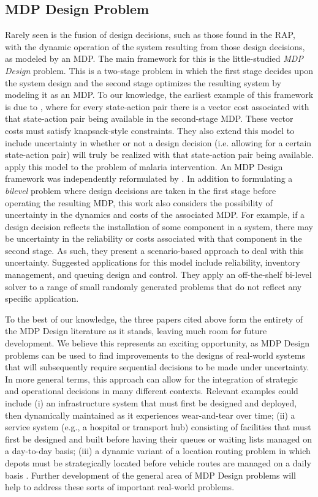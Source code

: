 \documentclass[11pt,authoryear,a4paper]{article}
\theoremstyle{definition}
\begin{document}
\subsection{MDP Design Problem}
Rarely seen is the fusion of design decisions, such as those found in the RAP, with the dynamic operation of the system resulting from those design decisions, as modeled by an MDP. The main framework for this is the little-studied \emph{MDP Design} problem. This is a two-stage problem in which the first stage decides upon the system design and the second stage optimizes the resulting system by modeling it as an MDP. To our knowledge, the earliest example of this framework is due to \cite{dimitrov2009mdpDesign}, where for every state-action pair there is a vector cost associated with that state-action pair being available in the second-stage MDP. These vector costs must satisfy knapsack-style constraints. They also extend this model to include uncertainty in whether or not a design decision (i.e. allowing for a certain state-action pair) will truly be realized with that state-action pair being available. \cite{DIMITROV2013mdpDesignMalaria} apply this model to the problem of malaria intervention. An MDP Design framework was independently reformulated by \cite{BROWN2024mdpDesignLetters}. In addition to formulating a \emph{bilevel} problem where design decisions are taken in the first stage before operating the resulting MDP, this work also considers the possibility of uncertainty in the dynamics and costs of the associated MDP. For example, if a design decision reflects the installation of some component in a system, there may be uncertainty in the reliability or costs associated with that component in the second stage. As such, they present a scenario-based approach to deal with this uncertainty. Suggested applications for this model include reliability, inventory management, and queuing design and control. They apply an off-the-shelf bi-level solver to a range of small randomly generated problems that do not reflect any specific application.

To the best of our knowledge, the three papers cited above form the entirety of the MDP Design literature as it stands, leaving much room for future development. We believe this represents an exciting opportunity, as MDP Design problems can be used to find improvements to the designs of real-world systems that will subsequently require sequential decisions to be made under uncertainty. In more general terms, this approach can allow for the integration of strategic and operational decisions in many different contexts. Relevant examples could include (i) an infrastructure system that must first be designed and deployed, then dynamically maintained as it experiences wear-and-tear over time; (ii) a service system (e.g., a hospital or transport hub) consisting of facilities that must first be designed and built before having their queues or waiting lists managed on a day-to-day basis; (iii) a dynamic variant of a location routing problem \citep{drexl2015locationRoutingsurvey} in which depots must be strategically located before vehicle routes are managed on a daily basis \citep{pillac2013dvrpSurvey}. Further development of the general area of MDP Design problems will help to address these sorts of important real-world problems.
\end{document}
